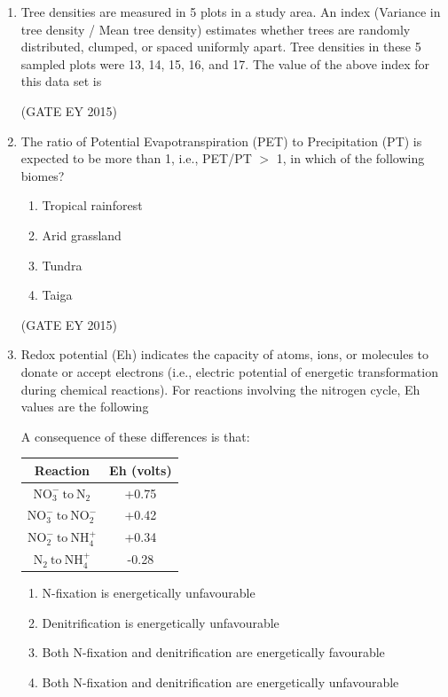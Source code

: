 \documentclass[journal,12pt,onecolumn]{IEEEtran}
\theoremstyle{remark}
\begin{document}
\begin{enumerate}

\item Tree densities are measured in 5 plots in a study area. An index (Variance in tree density / Mean tree density) estimates whether trees are randomly distributed, clumped, or spaced uniformly apart. Tree densities in these 5 sampled plots were 13, 14, 15, 16, and 17. The value of the above index for this data set is \underline{\hspace{2cm}}

\hfill{(GATE EY 2015)}


\item 
The ratio of Potential Evapotranspiration (PET) to Precipitation (PT) is expected to be more than 1, i.e., PET/PT $>$ 1, in which of the following biomes?

\begin{multicols}{4}
\begin{enumerate}
    
\item Tropical rainforest
\item Arid grassland
\item Tundra 
\item Taiga

    \end{enumerate}
    \end{multicols}
\hfill{(GATE EY 2015)}



\item 
Redox potential (Eh) indicates the capacity of atoms, ions, or molecules to donate or accept electrons (i.e., electric potential of energetic transformation during chemical reactions). For reactions involving the nitrogen cycle, Eh values are the following %

A consequence of these differences is that:



\begin{center}
\begin{tabular}{|c|c|}
\hline
\textbf{Reaction} & \textbf{Eh (volts)} \\ \hline
$\mathrm{NO_3^- \ to \ N_2}$ & +0.75 \\ \hline
$\mathrm{NO_3^- \ to \ NO_2^-}$ & +0.42 \\ \hline
$\mathrm{NO_2^- \ to \ NH_4^+}$ & +0.34 \\ \hline
$\mathrm{N_2 \ to \ NH_4^+}$ & -0.28 \\ \hline
\end{tabular}
\end{center}
\begin{enumerate}
\item N-fixation is energetically unfavourable
\item Denitrification is energetically unfavourable 
\item Both N-fixation and denitrification are energetically favourable
\item Both N-fixation and denitrification are energetically unfavourable


\end{enumerate}
\end{enumerate}
\end{document}
